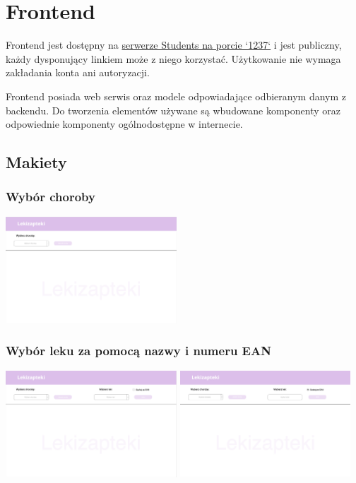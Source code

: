 \documentclass{article}
\begin{document}
  \section{Frontend}
  Frontend jest dostępny na
  \href{http://students.mimuw.edu.pl:1237}{serwerze Students na porcie `1237`} i jest publiczny,
  każdy dysponujący linkiem może z niego korzystać.
  Użytkowanie nie wymaga zakładania konta ani autoryzacji.

  Frontend posiada web serwis oraz modele odpowiadające odbieranym danym z backendu.
  Do tworzenia elementów używane są wbudowane komponenty oraz odpowiednie komponenty ogólnodostępne w internecie.

    \subsection{Makiety}
      \subsubsection{Wybór choroby}
      \includegraphics[width=6.4cm, height=4cm]{lekizapteki-wybor-choroby}

      \subsubsection{Wybór leku za pomocą nazwy i numeru EAN}
      \includegraphics[width=6.4cm, height=4cm]{lekizapteki-wybor-leku-nazwa}
      \includegraphics[width=6.4cm, height=4cm]{lekizapteki-wybor-leku-ean}
\end{document}

